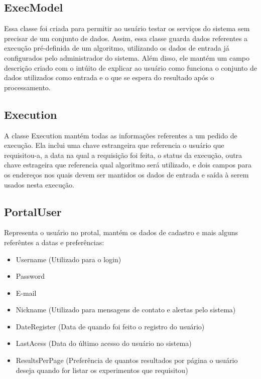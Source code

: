 \documentclass[tg]{mdtufsm}
\begin{document}
\subsection{ExecModel}
Essa classe foi criada para permitir ao usuário testar os serviços do sistema sem precisar de um conjunto de dados. Assim, essa classe guarda dados referentes a execução pré-definida de um algoritmo, utilizando os dados de entrada já configurados pelo administrador do sistema. Além disso, ele mantém um campo descrição criado com o intúito de explicar ao usuário como funciona o conjunto de dados utilizados como entrada e o que se espera do resultado após o processamento.

\subsection{Execution}
A classe Execution mantém todas as informações referentes a um pedido de execução. Ela inclui uma chave estrangeira que referencia o usuário que requisitou-a, a data na qual a requisição foi feita, o status da execução, outra chave estrageira que referencia qual algoritmo será utilizado, e dois campos para os endereços nos quais devem ser mantidos os dados de entrada e saída à serem usados nesta execução.

\subsection{PortalUser}
Representa o usuário no protal, mantém os dados de cadastro e mais alguns referêntes a datas e preferências:

\begin{itemize}
	\item Username (Utilizado para o login)
	\item Password 
	\item E-mail
	\item Nickname (Utilizado para mensagens de contato e alertas pelo sistema)
	\item DateRegister (Data de quando foi feito o registro do usuário)
	\item LastAcess (Data do último acesso do usuário no sistema)
	\item ResultsPerPage (Preferência de quantos resultados por página o usuário deseja quando for listar os experimentos que requisitou)
\end{itemize}
\end{document}
